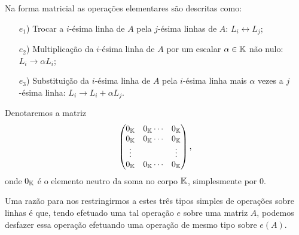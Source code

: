 Na forma matricial as opera\c{c}\~oes elementares s\~ao descritas como:
\begin{itemize}
	\item[$e_1$)] Trocar a $i$-\'esima linha de $A$ pela $j$-\'esima linhas de $A$: $L_i \leftrightarrow L_j$;
	\item[$e_2$)] Multiplica\c{c}\~ao da $i$-\'esima linha de $A$ por um escalar $\alpha \in \mathbb{K}$ n\~ao nulo: $L_i \rightarrow \alpha L_i$;
	\item[$e_3$)] Substitui\c{c}\~ao da $i$-\'esima linha de $A$ pela $i$-\'esima linha mais $\alpha$ vezes a $j$-\'esima linha: $L_i \rightarrow L_i + \alpha L_j$.
\end{itemize}

\begin{observacao}
	Denotaremos a matriz
	\[
		\begin{pmatrix}
			0_{\mathbb{K}} & 0_{\mathbb{K}} \cdots & 0_{\mathbb{K}}\\
			0_{\mathbb{K}} & 0_{\mathbb{K}} \cdots & 0_{\mathbb{K}}\\
			\vdots & & \vdots\\
			0_{\mathbb{K}} & 0_{\mathbb{K}} \cdots & 0_{\mathbb{K}}
		\end{pmatrix},
	\]
	onde $0_{\mathbb{K}}$ \'e o elemento neutro da soma no corpo $\mathbb{K}$, simplesmente por $0$.
\end{observacao}

Uma raz\~ao para nos restringirmos a estes tr\^es tipos simples de opera\c{c}\~oes sobre linhas \'e que, tendo efetuado uma tal opera\c{c}\~ao $e$ sobre uma matriz $A$, podemos desfazer essa opera\c{c}\~ao efetuando uma opera\c{c}\~ao de mesmo tipo sobre $e(A)$.

